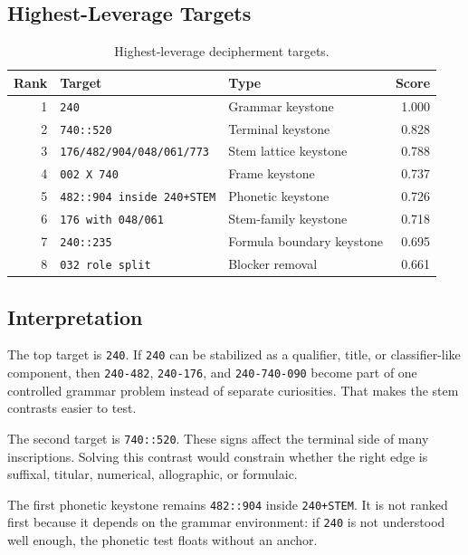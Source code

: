 \subsection{Highest-Leverage Targets}

\begin{table}[htbp]
\centering
\footnotesize
\begin{tabular}{rlp{}r}
\toprule
\textbf{Rank} & \textbf{Target} & \textbf{Type} & \textbf{Score} \\
\midrule
1 & \texttt{240} & Grammar keystone & 1.000 \\
2 & \texttt{740::520} & Terminal keystone & 0.828 \\
3 & \texttt{176/482/904/048/061/773} & Stem lattice keystone & 0.788 \\
4 & \texttt{002 X 740} & Frame keystone & 0.737 \\
5 & \texttt{482::904 inside 240+STEM} & Phonetic keystone & 0.726 \\
6 & \texttt{176 with 048/061} & Stem-family keystone & 0.718 \\
7 & \texttt{240::235} & Formula boundary keystone & 0.695 \\
8 & \texttt{032 role split} & Blocker removal & 0.661 \\
\bottomrule
\end{tabular}
\caption{Highest-leverage decipherment targets.}
\label{tab:breakthrough-targets}
\end{table}

\subsection{Interpretation}

The top target is \texttt{240}. If \texttt{240} can be stabilized as a qualifier, title, or classifier-like component, then \texttt{240-482}, \texttt{240-176}, and \texttt{240-740-090} become part of one controlled grammar problem instead of separate curiosities. That makes the stem contrasts easier to test.

The second target is \texttt{740::520}. These signs affect the terminal side of many inscriptions. Solving this contrast would constrain whether the right edge is suffixal, titular, numerical, allographic, or formulaic.

The first phonetic keystone remains \texttt{482::904} inside \texttt{240+STEM}. It is not ranked first because it depends on the grammar environment: if \texttt{240} is not understood well enough, the phonetic test floats without an anchor.

